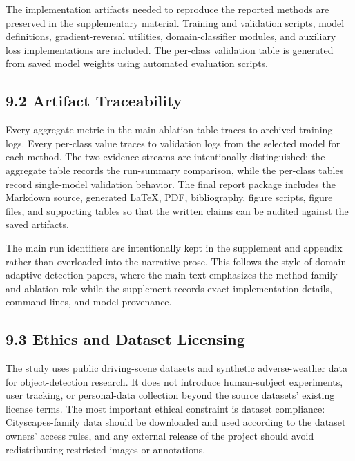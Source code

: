 \documentclass[
  11pt,
]{article}
\begin{document}
The implementation artifacts needed to reproduce the reported methods
are preserved in the supplementary material. Training and validation
scripts, model definitions, gradient-reversal utilities,
domain-classifier modules, and auxiliary loss implementations are
included. The per-class validation table is generated from saved model
weights using automated evaluation scripts.

\hypertarget{artifact-traceability}{%
\subsection{9.2 Artifact Traceability}\label{artifact-traceability}}

Every aggregate metric in the main ablation table traces to archived
training logs. Every per-class value traces to validation logs from the
selected model for each method. The two evidence streams are
intentionally distinguished: the aggregate table records the run-summary
comparison, while the per-class tables record single-model validation
behavior. The final report package includes the Markdown source,
generated LaTeX, PDF, bibliography, figure scripts, figure files, and
supporting tables so that the written claims can be audited against the
saved artifacts.

The main run identifiers are intentionally kept in the supplement and
appendix rather than overloaded into the narrative prose. This follows
the style of domain-adaptive detection papers, where the main text
emphasizes the method family and ablation role while the supplement
records exact implementation details, command lines, and model
provenance.

\hypertarget{ethics-and-dataset-licensing}{%
\subsection{9.3 Ethics and Dataset
Licensing}\label{ethics-and-dataset-licensing}}

The study uses public driving-scene datasets and synthetic
adverse-weather data for object-detection research. It does not
introduce human-subject experiments, user tracking, or personal-data
collection beyond the source datasets' existing license terms. The most
important ethical constraint is dataset compliance: Cityscapes-family
data should be downloaded and used according to the dataset owners'
access rules, and any external release of the project should avoid
redistributing restricted images or annotations.
\end{document}
